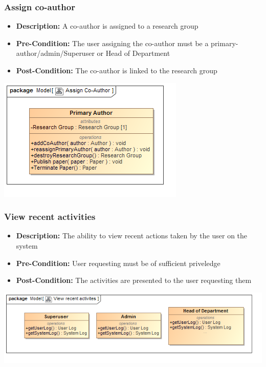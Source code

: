 \documentclass[11pt]{article}
\begin{document}
		\subsubsection{Assign co-author}
		\begin{itemize}
			\item \textbf{Description: }A co-author is assigned to a research group
			\item \textbf{Pre-Condition: }The user assigning the co-author must be a primary-author/admin/Superuser or Head of Department
			\item \textbf{Post-Condition: }The co-author is linked to the research group
		\end{itemize}
		\begin{center}
			\includegraphics[width=\textwidth]{../Diagrams/DomainModel/AssignCoAuthor.png}\\[0.5cm]
		\end{center}
		\newpage
		\subsubsection{View recent activities}
		\begin{itemize}
			\item \textbf{Description: }The ability to view recent actions taken by the user on the system
			\item \textbf{Pre-Condition: }User requesting must be of sufficient priveledge
			\item \textbf{Post-Condition: }The activities are presented to the user requesting them
		\end{itemize}
		\begin{center}
			\includegraphics[width=\textwidth]{../Diagrams/DomainModel/Viewrecentactivites.png}\\[0.5cm]
		\end{center}
		\newpage
\end{document}
